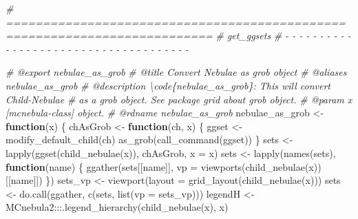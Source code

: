 \documentclass[
]{article}
\newenvironment{Shaded}{\begin{snugshade}}{\end{snugshade}}
\newcommand{\AttributeTok}[1]{\textcolor[rgb]{0.77,0.63,0.00}{#1}}
\newcommand{\CommentTok}[1]{\textcolor[rgb]{0.56,0.35,0.01}{\textit{#1}}}
\newcommand{\ControlFlowTok}[1]{\textcolor[rgb]{0.13,0.29,0.53}{\textbf{#1}}}
\newcommand{\FunctionTok}[1]{\textcolor[rgb]{0.00,0.00,0.00}{#1}}
\newcommand{\NormalTok}[1]{#1}
\newcommand{\OtherTok}[1]{\textcolor[rgb]{0.56,0.35,0.01}{#1}}
\newcommand{\SpecialCharTok}[1]{\textcolor[rgb]{0.00,0.00,0.00}{#1}}
\begin{document}
\begin{Shaded}
\begin{Highlighting}[]
\CommentTok{\# ==========================================================================}
\CommentTok{\# get\_ggsets}
\CommentTok{\# {-} {-} {-} {-} {-} {-} {-} {-} {-} {-} {-} {-} {-} {-} {-} {-} {-} {-} {-} {-} {-} {-} {-} {-} {-} {-} {-} {-} {-} {-} {-} {-} {-} {-} {-} {-} {-}}

\CommentTok{\#\textquotesingle{} @export nebulae\_as\_grob}
\CommentTok{\#\textquotesingle{} @title Convert Nebulae as \textquotesingle{}grob\textquotesingle{} object}
\CommentTok{\#\textquotesingle{} @aliases nebulae\_as\_grob}
\CommentTok{\#\textquotesingle{} @description \textbackslash{}code\{nebulae\_as\_grob\}: This will convert Child{-}Nebulae}
\CommentTok{\#\textquotesingle{} as a \textquotesingle{}grob\textquotesingle{} object. See package \textasciigrave{}grid\textasciigrave{} about \textquotesingle{}grob\textquotesingle{} object.}
\CommentTok{\#\textquotesingle{} @param x [mcnebula{-}class] object.}
\CommentTok{\#\textquotesingle{} @rdname nebulae\_as\_grob}
\NormalTok{nebulae\_as\_grob }\OtherTok{\textless{}{-}} \ControlFlowTok{function}\NormalTok{(x) \{}
\NormalTok{  chAsGrob }\OtherTok{\textless{}{-}} \ControlFlowTok{function}\NormalTok{(ch, x) \{}
\NormalTok{    ggset }\OtherTok{\textless{}{-}} \FunctionTok{modify\_default\_child}\NormalTok{(ch)}
    \FunctionTok{as\_grob}\NormalTok{(}\FunctionTok{call\_command}\NormalTok{(ggset))}
\NormalTok{  \}}
\NormalTok{  sets }\OtherTok{\textless{}{-}} \FunctionTok{lapply}\NormalTok{(}\FunctionTok{ggset}\NormalTok{(}\FunctionTok{child\_nebulae}\NormalTok{(x)), chAsGrob, }\AttributeTok{x =}\NormalTok{ x)}
\NormalTok{  sets }\OtherTok{\textless{}{-}} \FunctionTok{lapply}\NormalTok{(}\FunctionTok{names}\NormalTok{(sets),}
    \ControlFlowTok{function}\NormalTok{(name) \{}
      \FunctionTok{ggather}\NormalTok{(sets[[name]],}
        \AttributeTok{vp =} \FunctionTok{viewports}\NormalTok{(}\FunctionTok{child\_nebulae}\NormalTok{(x))[[name]])}
\NormalTok{    \})}
\NormalTok{  sets\_vp }\OtherTok{\textless{}{-}} \FunctionTok{viewport}\NormalTok{(}\AttributeTok{layout =} \FunctionTok{grid\_layout}\NormalTok{(}\FunctionTok{child\_nebulae}\NormalTok{(x)))}
\NormalTok{  sets }\OtherTok{\textless{}{-}} \FunctionTok{do.call}\NormalTok{(ggather, }\FunctionTok{c}\NormalTok{(sets, }\FunctionTok{list}\NormalTok{(}\AttributeTok{vp =}\NormalTok{ sets\_vp)))}
\NormalTok{  legendH }\OtherTok{\textless{}{-}}\NormalTok{ MCnebula2}\SpecialCharTok{:::}\FunctionTok{.legend\_hierarchy}\NormalTok{(}\FunctionTok{child\_nebulae}\NormalTok{(x), x)}

\end{Highlighting}
\end{Shaded}
\end{document}
